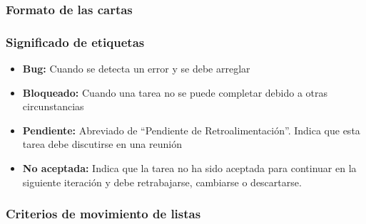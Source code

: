 \subsubsection{Formato de las cartas}




\subsubsection{Significado de etiquetas}
\begin{itemize}
    \item \textbf{Bug:} Cuando se detecta un error y se debe arreglar
    \item \textbf{Bloqueado:} Cuando una tarea no se puede completar debido a
    otras circunstancias
    \item \textbf{Pendiente:} Abreviado de “Pendiente de Retroalimentación”.
    Indica que esta tarea debe discutirse en una reunión
    \item \textbf{No aceptada:} Indica que la tarea no ha sido aceptada para
    continuar en la siguiente iteración y debe retrabajarse, cambiarse o
    descartarse.
\end{itemize}

\subsubsection{Criterios de movimiento de listas}




